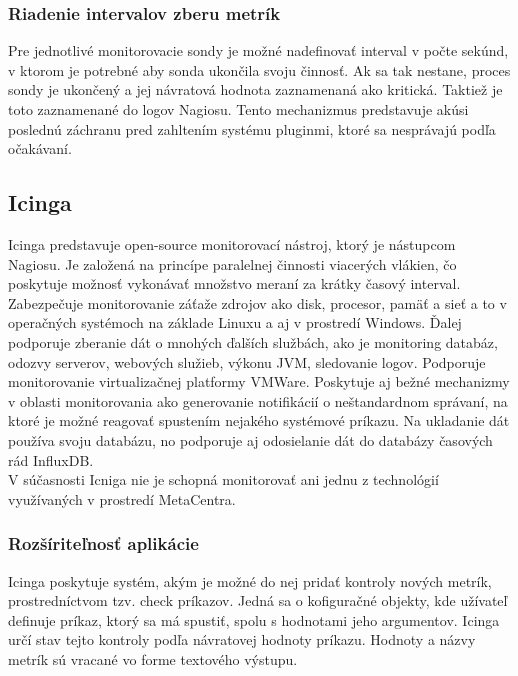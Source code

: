 \documentclass[12pt,twoside,color,cover,table]{fithesis3}
\begin{document}
\subsubsection{Riadenie intervalov zberu metrík}
Pre jednotlivé monitorovacie sondy je možné nadefinovať interval v počte sekúnd, v ktorom je potrebné aby sonda ukončila svoju činnosť. Ak sa tak nestane, proces sondy je ukončený a jej návratová hodnota
zaznamenaná ako kritická. Taktiež je toto zaznamenané do logov Nagiosu. Tento mechanizmus predstavuje akúsi poslednú záchranu pred zahltením systému pluginmi, ktoré sa nesprávajú podľa očakávaní.

\subsection{Icinga}
Icinga predstavuje open-source monitorovací nástroj, ktorý je nástupcom Nagiosu. Je založená na princípe paralelnej činnosti viacerých vlákien, čo poskytuje možnosť vykonávať množstvo meraní
za krátky časový interval. Zabezpečuje monitorovanie záťaže zdrojov ako disk, procesor, pamäť a sieť a to v operačných systémoch na základe Linuxu a aj v prostredí Windows. Ďalej podporuje zberanie
dát o mnohých ďalších službách, ako je monitoring databáz, odozvy serverov, webových služieb, výkonu JVM, sledovanie logov. Podporuje monitorovanie virtualizačnej platformy VMWare. 
Poskytuje aj bežné mechanizmy v oblasti monitorovania ako generovanie notifikácií o neštandardnom správaní, na ktoré je možné reagovať spustením nejakého systémové príkazu. Na ukladanie dát 
používa svoju databázu, no podporuje aj odosielanie dát do databázy časových rád InfluxDB.
\\V súčasnosti Icniga nie je schopná monitorovať ani jednu z technológií využívaných v prostredí MetaCentra.

\subsubsection{Rozšíriteľnosť aplikácie}
Icinga poskytuje systém, akým je možné do nej pridať kontroly nových metrík, prostredníctvom tzv. check príkazov. Jedná sa o kofiguračné objekty, kde užívateľ definuje príkaz,
ktorý sa má spustiť, spolu s hodnotami jeho argumentov. Icinga určí stav tejto kontroly podľa návratovej hodnoty príkazu.%
Hodnoty a názvy metrík sú vracané vo forme textového výstupu.
\end{document}
